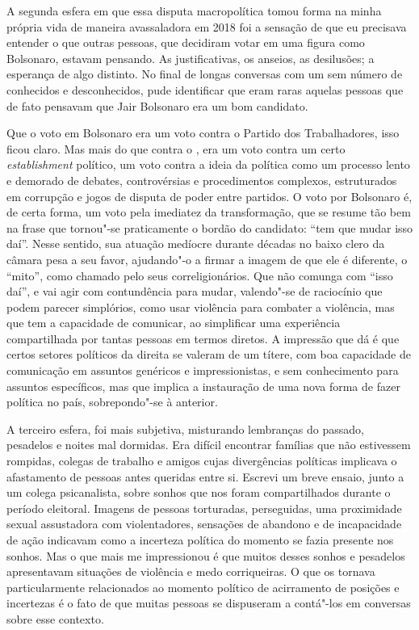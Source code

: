 A segunda esfera em que essa disputa macropolítica tomou forma na minha
própria vida de maneira avassaladora em 2018 foi a sensação de que eu
precisava entender o que outras pessoas, que decidiram votar em uma
figura como Bolsonaro, estavam pensando. As justificativas, os anseios,
as desilusões; a esperança de algo distinto. No final de longas
conversas com um sem número de conhecidos e desconhecidos, pude
identificar que eram raras aquelas pessoas que de fato pensavam que Jair
Bolsonaro era um bom candidato.

Que o voto em Bolsonaro era um voto contra o Partido dos Trabalhadores,
isso ficou claro. Mas mais do que contra o , era um voto contra um
certo \emph{establishment} político, um voto contra a ideia da política
como um processo lento e demorado de debates, controvérsias e
procedimentos complexos, estruturados em corrupção e jogos de disputa de
poder entre partidos. O voto por Bolsonaro é, de certa forma, um voto
pela imediatez da transformação, que se resume tão bem na frase que
tornou"-se praticamente o bordão do candidato: ``tem que mudar isso
daí''. Nesse sentido, sua atuação medíocre durante décadas no baixo
clero da câmara pesa a seu favor, ajudando"-o a firmar a imagem de que
ele é diferente, o ``mito'', como chamado pelo seus correligionários.
Que não comunga com ``isso daí'', e vai agir com contundência para
mudar, valendo"-se de raciocínio que podem parecer simplórios, como usar
violência para combater a violência, mas que tem a capacidade de
comunicar, ao simplificar uma experiência compartilhada por tantas
pessoas em termos diretos. A impressão que dá é que certos setores
políticos da direita se valeram de um títere, com boa capacidade de
comunicação em assuntos genéricos e impressionistas, e sem conhecimento
para assuntos específicos, mas que implica a instauração de uma nova
forma de fazer política no país, sobrepondo"-se à anterior.

A terceiro esfera, foi mais subjetiva, misturando lembranças do passado,
pesadelos e noites mal dormidas. Era difícil encontrar famílias que não
estivessem rompidas, colegas de trabalho e amigos cujas divergências
políticas implicava o afastamento de pessoas antes queridas entre si.
Escrevi um breve ensaio, junto a um colega psicanalista, sobre sonhos
que nos foram compartilhados durante o período eleitoral. Imagens de
pessoas torturadas, perseguidas, uma proximidade sexual assustadora com
violentadores, sensações de abandono e de incapacidade de ação indicavam
como a incerteza política do momento se fazia presente nos sonhos. Mas o
que mais me impressionou é que muitos desses sonhos e pesadelos
apresentavam situações de violência e medo corriqueiras. O que os
tornava particularmente relacionados ao momento político de acirramento
de posições e incertezas é o fato de que muitas pessoas se dispuseram a
contá"-los em conversas sobre esse contexto.

